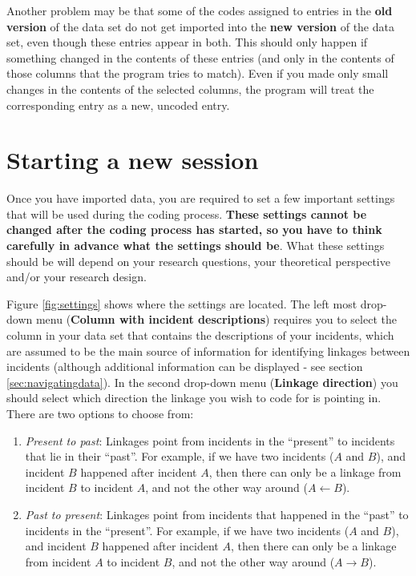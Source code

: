 \documentclass{memoir}
\begin{document}
Another problem may be that some of the codes assigned to entries in the \textbf{old version} of the data set do not get imported into the \textbf{new version} of the data set, even though these entries appear in both. This should only happen if something changed in the contents of these entries (and only in the contents of those columns that the program tries to match). Even if you made only small changes in the contents of the selected columns, the program will treat the corresponding entry as a new, uncoded entry.

\section{Starting a new session}
\label{sec:startinganewsession}

Once you have imported data, you are required to set a few important settings that will be used during the coding process. \textbf{These settings cannot be changed after the coding process has started, so you have to think carefully in advance what the settings should be}. What these settings should be will depend on your research questions, your theoretical perspective and/or your research design.

Figure \ref{fig:settings} shows where the settings are located. The left most drop-down menu (\textbf{Column with incident descriptions}) requires you to select the column in your data set that contains the descriptions of your incidents, which are assumed to be the main source of information for identifying linkages between incidents (although additional information can be displayed - see section \ref{sec:navigatingdata}). In the second drop-down menu (\textbf{Linkage direction}) you should select which direction the linkage you wish to code for is pointing in. There are two options to choose from:
\begin{enumerate}
\item{\emph{Present to past}: Linkages point from incidents in the ``present'' to incidents that lie in their ``past''. For example, if we have two incidents (\(A\) and \(B\)), and incident \(B\) happened after incident \(A\), then there can only be a linkage from incident \(B\) to incident \(A\), and not the other way around (\(A\leftarrow B\)).}
\item{\emph{Past to present}: Linkages point from incidents that happened in the ``past'' to incidents in the ``present''}. For example, if we have two incidents (\(A\) and \(B\)), and incident \(B\) happened after incident \(A\), then there can only be a linkage from incident \(A\) to incident \(B\), and not the other way around (\(A\rightarrow B\)).
\end{enumerate}
\end{document}
